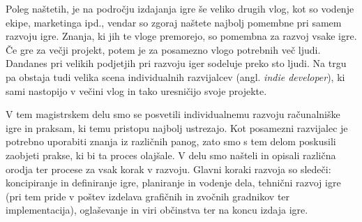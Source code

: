 \documentclass[12pt,a4paper,twoside]{book}
\begin{document}
Poleg naštetih, je na področju izdajanja igre še veliko drugih vlog, kot so vodenje ekipe, marketinga ipd., vendar so zgoraj naštete najbolj pomembne pri samem razvoju igre. Znanja, ki jih te vloge premorejo, so pomembna za razvoj vsake igre. Če gre za večji projekt, potem je za posamezno vlogo potrebnih več ljudi. Dandanes pri velikih podjetjih pri razvoju iger sodeluje preko sto ljudi. Na trgu pa obstaja tudi velika scena individualnih razvijalcev (angl. \textit{indie developer}), ki sami nastopijo v večini vlog in tako uresničijo svoje projekte. 

V tem magistrskem delu smo se posvetili individualnemu razvoju računalniške igre in praksam, ki temu pristopu najbolj ustrezajo. Kot posamezni razvijalec je potrebno uporabiti znanja iz različnih panog, zato smo s tem delom poskusili zaobjeti prakse, ki bi ta proces olajšale. V delu smo našteli in opisali različna orodja ter procese za vsak korak v razvoju. Glavni koraki razvoja so sledeči: koncipiranje in definiranje igre, planiranje in vodenje dela, tehnični razvoj igre (pri tem pride v poštev izdelava grafičnih in zvočnih gradnikov ter implementacija), oglaševanje in viri občinstva ter na koncu izdaja igre.
\end{document}
